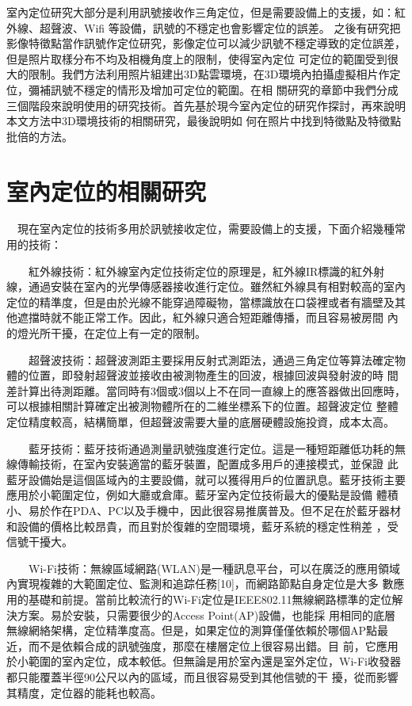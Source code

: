 
	室內定位研究大部分是利用訊號接收作三角定位，但是需要設備上的支援，如：紅外線、超聲波、Wifi 等設備，訊號的不穩定也會影響定位的誤差。
之後有研究把影像特徵點當作訊號作定位研究，影像定位可以減少訊號不穩定導致的定位誤差，但是照片取樣分布不均及相機角度上的限制，使得室內定位
可定位的範圍受到很大的限制。我們方法利用照片組建出3D點雲環境，在3D環境內拍攝虛擬相片作定位，彌補訊號不穩定的情形及增加可定位的範圍。在相
關研究的章節中我們分成三個階段來說明使用的研究技術。首先基於現今室內定位的研究作探討，再來說明本文方法中3D環境技術的相關研究，最後說明如
何在照片中找到特徵點及特徵點批倍的方法。

\section{室內定位的相關研究}

	　現在室內定位的技術多用於訊號接收定位，需要設備上的支援，下面介紹幾種常用的技術：

　　紅外線技術：紅外線室內定位技術定位的原理是，紅外線IR標識的紅外射線，通過安裝在室內的光學傳感器接收進行定位。雖然紅外線具有相對較高的室內
定位的精準度，但是由於光線不能穿過障礙物，當標識放在口袋裡或者有牆壁及其他遮擋時就不能正常工作。因此，紅外線只適合短距離傳播，而且容易被房間
內的燈光所干擾，在定位上有一定的限制。

　　超聲波技術：超聲波測距主要採用反射式測距法，通過三角定位等算法確定物體的位置，即發射超聲波並接收由被測物產生的回波，根據回波與發射波的時
間差計算出待測距離。當同時有3個或3個以上不在同一直線上的應答器做出回應時，可以根據相關計算確定出被測物體所在的二維坐標系下的位置。超聲波定位
整體定位精度較高，結構簡單，但超聲波需要大量的底層硬體設施投資，成本太高。

　　藍牙技術：藍牙技術通過測量訊號強度進行定位。這是一種短距離低功耗的無線傳輸技術，在室內安裝適當的藍牙裝置，配置成多用戶的連接模式，並保證
此藍牙設備始是這個區域內的主要設備，就可以獲得用戶的位置訊息。藍牙技術主要應用於小範圍定位，例如大廳或倉庫。藍牙室內定位技術最大的優點是設備
體積小、易於作在PDA、PC以及手機中，因此很容易推廣普及。但不足在於藍牙器材和設備的價格比較昂貴，而且對於復雜的空間環境，藍牙系統的穩定性稍差
，受信號干擾大。

　　Wi-Fi技術：無線區域網路(WLAN)是一種訊息平台，可以在廣泛的應用領域內實現複雜的大範圍定位、監測和追踪任務[10]，而網路節點自身定位是大多
數應用的基礎和前提。當前比較流行的Wi-Fi定位是IEEE802.11無線網路標準的定位解決方案。易於安裝，只需要很少的Access Point(AP)設備，也能採
用相同的底層無線網絡架構，定位精準度高。但是，如果定位的測算僅僅依賴於哪個AP點最近，而不是依賴合成的訊號強度，那麼在樓層定位上很容易出錯。目
前，它應用於小範圍的室內定位，成本較低。但無論是用於室內還是室外定位，Wi-Fi收發器都只能覆蓋半徑90公尺以內的區域，而且很容易受到其他信號的干
擾，從而影響其精度，定位器的能耗也較高。


